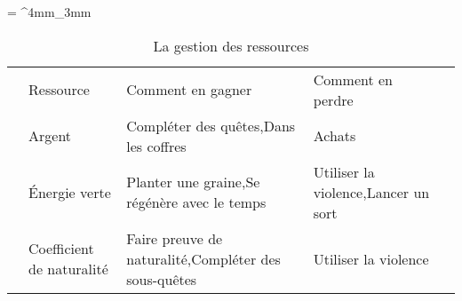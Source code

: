 \documentclass[a4paper, 10pt, oneside, fleqn]{report}
\begin{document}
	
	\everyrow{\tabucline[.4mm  white]{}}
	\tabulinesep = ^4mm_3mm
	
	
	\begin{table}[ht!]
		\begin{tabu} to \textwidth {l X X[1.2] X[1.2] l }
			\rowfont{\bfseries\sffamily\leavevmode\color{white}}
			& Ressource & Comment en gagner & Comment en perdre & \\
			& Argent & Compléter des quêtes,\newline Dans les coffres & Achats & \\
			& Énergie verte & Planter une graine,\newline Se régénère avec le temps & Utiliser la violence,\newline Lancer un sort & \\
			& Coefficient de naturalité & Faire preuve de naturalité,\newline Compléter des sous-quêtes & Utiliser la violence & \\
		\end{tabu}
		\caption{La gestion des ressources}
	\end{table}
	
\end{document}
